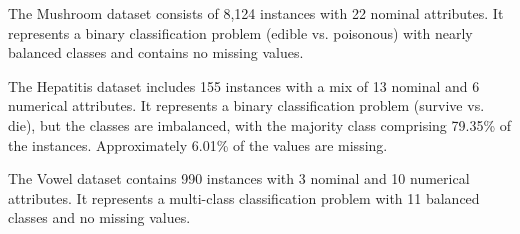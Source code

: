 The Mushroom dataset consists of 8,124 instances with 22 nominal attributes. It represents a binary classification problem (edible vs. poisonous) with nearly balanced classes and contains no missing values. 

The Hepatitis dataset includes 155 instances with a mix of 13 nominal and 6 numerical attributes. It represents a binary classification problem (survive vs. die), but the classes are imbalanced, with the majority class comprising 79.35\% of the instances. Approximately 6.01\% of the values are missing. 

The Vowel dataset contains 990 instances with 3 nominal and 10 numerical attributes. It represents a multi-class classification problem with 11 balanced classes and no missing values. 





    
